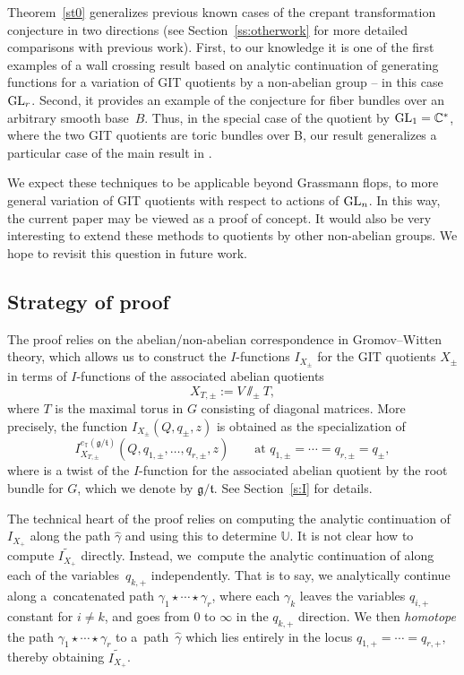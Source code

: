 \documentclass[pdftex]{sigma}
\numberwithin{equation}{section}
\newcommand{\CC}{\mathbb{C}}
\newcommand{\UU}{\mathbb{U}}
\newcommand{\torus}{\mathbb{T}}
\begin{document}
Theorem~\ref{st0} generalizes previous known cases of the crepant transformation conjecture in two directions (see Section~\ref{ss:otherwork} for more detailed comparisons with previous work). First, to our knowledge it is one of the first examples
of a wall crossing result based on analytic continuation of generating functions for a variation of GIT quotients by a non-abelian group -- in this case~${\rm GL}_r$. Second, it provides an example of the conjecture for fiber bundles over an arbitrary smooth base~$B$. Thus, in the special case of the quotient by ${\rm GL}_1 = \CC^*$, where the two GIT quotients are toric bundles over B, our result generalizes a particular case of the main result in \cite{CIJ}.

We expect these techniques to be applicable beyond Grassmann flops, to more general variation of GIT quotients with respect to actions of ${\rm GL}_n$. In this way, the current paper may be viewed as a proof of concept. It would also be very interesting to extend these methods to quotients by other non-abelian groups. We hope to revisit this question in future work.

\subsection{Strategy of proof}
The proof relies on the abelian/non-abelian correspondence in Gromov--Witten theory, which allows us to construct the $I$-functions $I_{X_\pm}$ for the GIT quotients $X_\pm$ in terms of $I$-functions of the associated abelian quotients
\[
X_{T, \pm}:= V \sslash_{\pm} T,
\]
where $T$ is the maximal torus in $G$ consisting of diagonal matrices.
More precisely, the function $I_{X_\pm}(Q, q_\pm, z)$ is obtained as the specialization of
\[
I_{X_{T, \pm}}^{e_\torus(\mathfrak g /\mathfrak t)}(Q, q_{1,\pm}, \dots, q_{r,\pm}, z) \qquad \text{at $q_{1,\pm}= \cdots = q_{r,\pm} = q_\pm$},
\]
where \smash{$I_{X_{T, \pm}}^{e_\torus(\mathfrak g /\mathfrak t)}$} is a twist of the $I$-function for the associated abelian quotient by the root bundle for $G$, which we denote by $\mathfrak g /\mathfrak t$. See Section~\ref{s:I} for details.

The technical heart of the proof relies on computing the analytic continuation of $I_{X_{+}}$ along the path $\hat \gamma$ and using this to determine $\UU$. It is not clear how to compute $\widetilde{I_{X_{+}}}$ directly. Instead, we~compute the analytic continuation of
\smash{$I_{X_{T, +}}^{e_\torus(\mathfrak g /\mathfrak t)}(Q, q_{1,+}, \dots, q_{r,+}, z)$} along each of the variables~$q_{k,+}$ independently. That is to say, we analytically continue \smash{$I_{X_{T, +}}^{e_\torus(\mathfrak g /\mathfrak t)}(Q, q_{1,+}, \dots, q_{r,+}, z)$} along a~concatenated path $\gamma_1 \star \cdots \star \gamma_r$, where each $\gamma_k$ leaves the variables $q_{i, +}$ constant for $i \neq k$, and goes from $0$ to $\infty$ in the $q_{k, +}$ direction. We then \emph{homotope} the path $\gamma_1 \star \cdots \star \gamma_r$ to a~path~$\hat \gamma$ which lies entirely in the locus $q_{1,+}= \cdots = q_{r,+},$ thereby obtaining $\widetilde{I_{X_{+}}}$.
\end{document}
